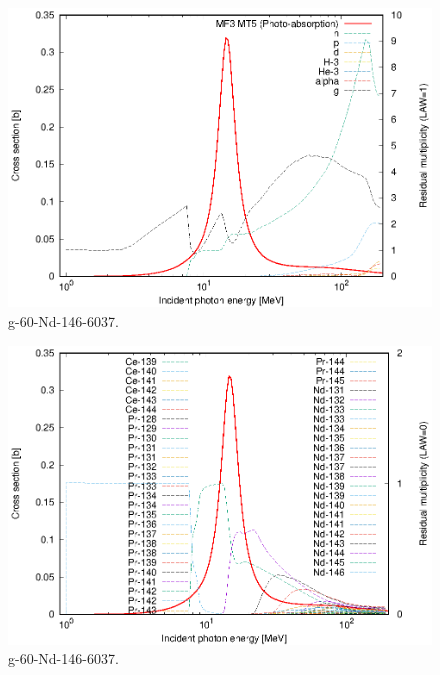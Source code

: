 \begin{figure}
 \includegraphics[width=\linewidth]{eps/g_60-Nd-146_6037.eps}
  \caption{g-60-Nd-146-6037.}
\end{figure}
\begin{figure}
 \includegraphics[width=\linewidth]{eps-law0/g_60-Nd-146_6037.eps}
 \caption{g-60-Nd-146-6037.}
\end{figure}
\newpage \clearpage

